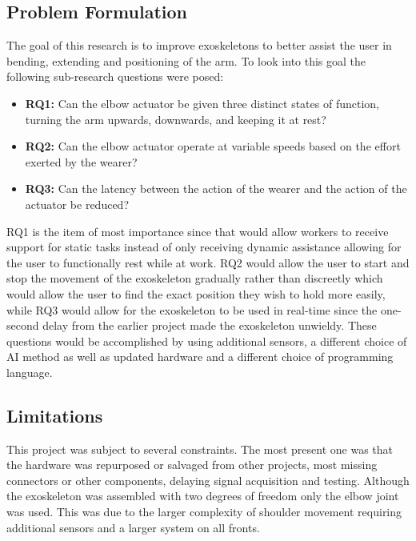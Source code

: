 \subsection{Problem Formulation}
The goal of this research is to improve exoskeletons to better assist the user in bending, extending and positioning of the arm.
To look into this goal the following sub-research questions were posed:
\begin{itemize}
        
    \item \textbf{RQ1:} Can the elbow actuator be given three distinct states of function, turning the arm upwards, downwards, and keeping it at rest?

    \item \textbf{RQ2:} Can the elbow actuator operate at variable speeds based on the effort exerted by the wearer?

    \item \textbf{RQ3:} Can the latency between the action of the wearer and the action of the actuator be reduced?

\end{itemize}
RQ1 is the item of most importance since that would allow workers to receive support for static tasks instead of only receiving dynamic
assistance allowing for the user to functionally rest while at work. RQ2 would allow the user to start and stop the
movement of the exoskeleton gradually rather than discreetly which would allow the user to find the exact position they
wish to hold more easily, while RQ3 would allow for the exoskeleton to be used in real-time since the one-second delay from the earlier project made the exoskeleton unwieldy. 
These questions would be accomplished by using additional sensors, a different choice of AI method as well as updated hardware and a different
choice of programming language.\newline


\subsection{Limitations}
This project was subject to several constraints. 
The most present one was that the hardware was repurposed or salvaged from other projects, most missing connectors or other components,
delaying signal acquisition and testing.
Although the exoskeleton was assembled with two degrees of freedom only the elbow joint was used.
This was due to the larger complexity of shoulder movement requiring additional sensors and a larger system on all
fronts.
